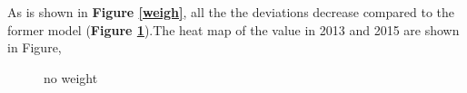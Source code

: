 \documentclass[12pt]{article}
\begin{document}
As is shown in \textbf{Figure \ref{weigh}}, all the the deviations decrease compared to the former model (\textbf{Figure \ref{noweigh}}).The heat map of the value in 2013 and 2015 are shown in Figure,

\begin{figure}[h]
\centering
{}
\caption{no weight}
\label{noweigh}
\end{figure}
\end{document}
